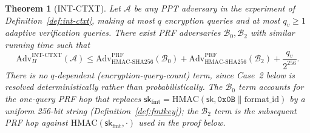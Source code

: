 \documentclass[11pt,a4paper]{article}
\newtheorem{theorem}{Theorem}[section]
\begin{document}
\begin{theorem}[INT-CTXT]\label{thm:int-ctxt}
Let $\mathcal{A}$ be any PPT adversary in the experiment of
Definition~\ref{def:int-ctxt}, making at most $q$ encryption queries
and at most $q_v\ge1$ adaptive verification queries. There exist PRF
adversaries $\mathcal{B}_0,\mathcal{B}_2$ with similar running time such
that
\[
  \mathrm{Adv}^{\mathrm{INT\text{-}CTXT}}_{\Pi}(\mathcal{A})
  \leq
  \mathrm{Adv}^{\mathrm{PRF}}_{\mathrm{HMAC\text{-}SHA256}}(\mathcal{B}_0)
  + \mathrm{Adv}^{\mathrm{PRF}}_{\mathrm{HMAC\text{-}SHA256}}(\mathcal{B}_2)
  + \frac{q_v}{2^{256}}.
\]
There is no $q$-dependent (encryption-query-count) term, since Case~2
below is resolved deterministically rather than probabilistically. The
$\mathcal{B}_0$ term accounts for the one-query PRF hop that replaces
$\mathsf{sk}_{\mathrm{fmt}}=\mathrm{HMAC}(\mathsf{sk},\texttt{0x0B}\|\mathrm{format\_id})$
by a uniform 256-bit string (Definition~\ref{def:fmtkey}); the
$\mathcal{B}_2$ term is the subsequent PRF hop against
$\mathrm{HMAC}(\mathsf{sk}_{\mathrm{fmt}},\cdot)$ used in the proof
below.
\end{theorem}
\end{document}
